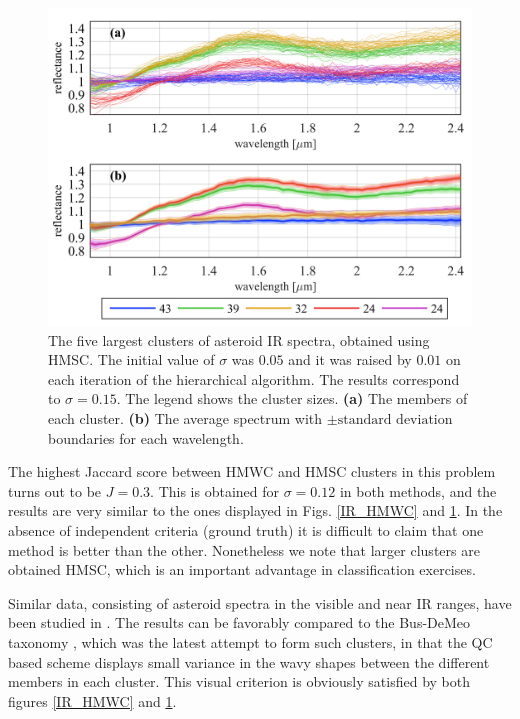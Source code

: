 \documentclass[preprint,12pt]{elsarticle}
\begin{document}
\begin{figure}[tb]
\centering
\includegraphics[width=0.6\linewidth]{fig5.png}
\caption{ The five largest clusters of asteroid IR spectra, obtained using HMSC. The initial value of $\sigma$ was $0.05$ and it was raised by $0.01$ on each iteration of the hierarchical algorithm. The results correspond to $\sigma=0.15$. The legend shows the cluster sizes. \textbf{(a)}  The members of each cluster. \textbf{(b)} The average spectrum with $\pm\textrm{standard deviation}$ boundaries for each wavelength.}
\label{IR_HMSC}
\end{figure}


The highest Jaccard score between HMWC and HMSC clusters in this problem turns out to be $J=0.3$. This is obtained for $\sigma=0.12$ in both methods, and the results are very similar to the ones displayed in Figs. \ref{IR_HMWC} and \ref{IR_HMSC}. In the absence of independent criteria (ground truth) it is difficult to claim that one method is better than the other. Nonetheless we note that larger clusters are obtained HMSC, which is an important advantage in classification exercises.

Similar data, consisting of asteroid spectra in the visible and near IR ranges, have been studied in \cite{deutsch2017quantum}. The results can be favorably compared to the Bus-DeMeo taxonomy \cite{demeo2009extension}, which was the latest attempt to form such clusters, in that the QC based scheme displays small variance in the wavy shapes between the different members in each cluster. This visual criterion is obviously satisfied by both figures \ref{IR_HMWC} and \ref{IR_HMSC}.
\end{document}
